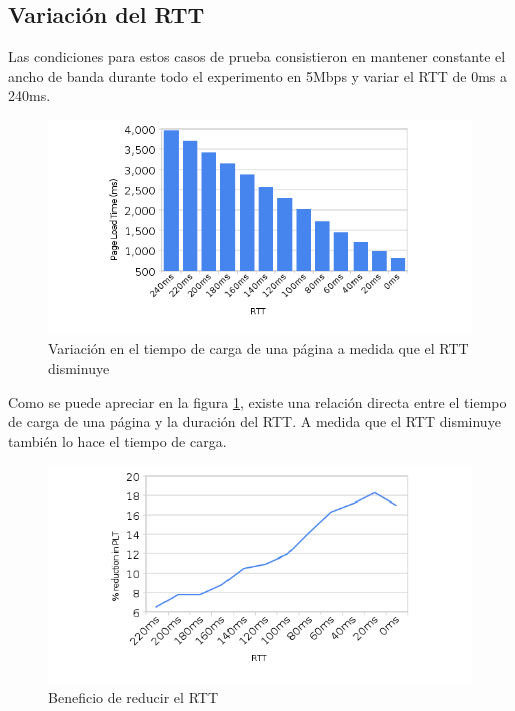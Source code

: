 \subsection{Variación del RTT}
Las condiciones para estos casos de prueba consistieron en mantener constante el ancho de banda durante todo el experimento en 5Mbps y variar el RTT de 0ms a 240ms.

\begin{figure}[h!]
\centering
\includegraphics[width=1\textwidth]{figuras/page_load_time_as_rtt_decreases.png}
	\caption{Variación en el tiempo de carga de una página a medida que el RTT disminuye}
    \label{fig.pageloadtimeasrttdecreases}
\end{figure}

Como se puede apreciar en la figura \ref{fig.pageloadtimeasrttdecreases}, existe una relación directa entre el tiempo de carga de una página y
la duración del RTT. A medida que el RTT disminuye también lo hace el tiempo de carga.

\begin{figure}[h!]
\centering
\includegraphics[width=1\textwidth]{figuras/beneficios_de_disminuir_rtt.png}
	\caption{Beneficio de reducir el RTT}
    \label{fig.beneficiosdedisminuirrtt}
\end{figure}


